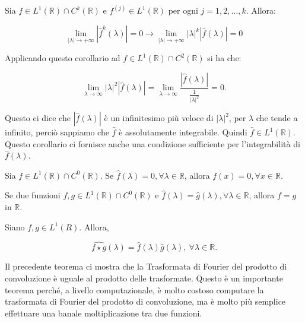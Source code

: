 \begin{corollary}
    Sia $f \in L^1(\mathbb{R}) \cap C^k(\mathbb{R})$ e $f^{\left(j\right)} \in
        L^1(\mathbb{R})$ per ogni $j = 1, 2, \ldots, k$. Allora:
    
    $$
        \lim_{ |\lambda| \rightarrow +\infty } \left| \hat{f}^k(\lambda) \right| = 0 \rightarrow
        \lim_{ |\lambda| \rightarrow +\infty } \left|\lambda\right|^k\left| \hat{f}(\lambda) \right| = 0
    $$
\end{corollary}

Applicando questo corollario ad $f \in L^1(\mathbb{R}) \cap C^2(\mathbb{R})$ si ha che:

    $$
        \lim_{\lambda \rightarrow \infty} \left| \lambda \right|^2 \left|
        \hat{f}(\lambda) \right|  = \lim_{\lambda \rightarrow \infty}
        \frac{\left|\hat{f}(\lambda)\right|}{ \frac{1}{ \left| \lambda
                \right|^2}} = 0.
    $$

Questo ci dice che $\left|\hat{f}(\lambda)\right|$ è un infinitesimo più veloce di
$\left|\lambda\right|^2$, per $\lambda$ che tende a infinito, perciò sappiamo che $\hat{f}$ è
assolutamente integrabile. Quindi $\hat{f} \in L^1(\mathbb{R})$. Questo
corollario ci fornisce anche una condizione sufficiente per l'integrabilità di
$\hat{f}(\lambda)$.

\begin{theorem}
    Sia $f \in L^1(\mathbb{R}) \cap C^0(\mathbb{R})$.
    Se $\hat{f}(\lambda) = 0, \forall \lambda \in \mathbb{R}$, allora $f(x) = 0, \forall x \in \mathbb{R}$.\\
\end{theorem}

\begin{corollary}
    Se due funzioni $f, g \in L^1(\mathbb{R}) \cap C^0(\mathbb{R})$ e $\hat{f}(\lambda) = \hat{g}(\lambda), \forall \lambda \in \mathbb{R}$,
    allora $f = g$ in $\mathbb{R}$.
\end{corollary}

\begin{theorem}
    Siano $f, g \in L^1(R)$. Allora,
    
    $$
        \widehat{f \star g}(\lambda) = \hat{f}(\lambda) \hat{g}(\lambda), \
        \forall \lambda \in \mathbb{R}.
    $$
\end{theorem}

Il precedente teorema ci mostra che la Trasformata di Fourier del prodotto di
convoluzione è uguale al prodotto delle trasformate. Questo è un importante teorema
perché, a livello computazionale, è molto costoso computare la trasformata di Fourier
del prodotto di convoluzione, ma è molto più semplice effettuare una banale moltiplicazione
tra due funzioni.

